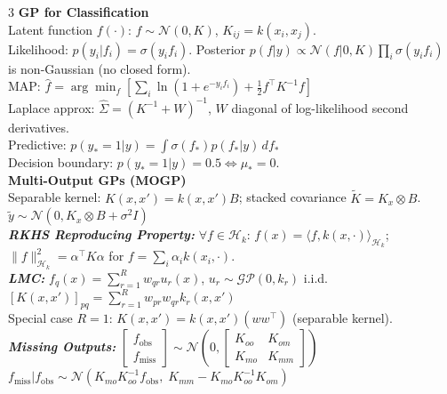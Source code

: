 \documentclass[a4paper,7pt]{article}
\begin{document}
\begin{multicols*}{3}
\textbf{GP for Classification}\\
Latent function $f(\cdot)$: $f\sim\mathcal{N}(0,K)$, $K_{ij}=k(x_i,x_j)$.\\
Likelihood: $p(y_i|f_i)=\sigma(y_i f_i)$. Posterior $p(f|y)\propto\mathcal{N}(f|0,K)\prod_i\sigma(y_if_i)$ is non-Gaussian (no closed form).\\
MAP: $\hat f=\arg\min_f[\sum_i\ln(1+e^{-y_if_i})+\frac{1}{2}f^\top K^{-1}f]$\\
Laplace approx: $\hat\Sigma=(K^{-1}+W)^{-1}$, $W$ diagonal of log-likelihood second derivatives.\\
Predictive: $p(y_*=1|y)=\int\sigma(f_*)p(f_*|y)\,df_*$\\
Decision boundary: $p(y_*=1|y)=0.5\Leftrightarrow\mu_*=0$.\\

\textbf{Multi-Output GPs (MOGP)}\\
Separable kernel: $K(x,x')=k(x,x')B$; stacked covariance $\tilde K=K_x\otimes B$.\\
$\tilde y\sim\mathcal{N}(0,K_x\otimes B+\sigma^2 I)$\\

\textit{\textbf{RKHS Reproducing Property:}} $\forall f\in\mathcal{H}_k$: $f(x)=\langle f,k(x,\cdot)\rangle_{\mathcal{H}_k}$; $\|f\|_{\mathcal{H}_k}^2=\alpha^\top K\alpha$ for $f=\sum_i\alpha_i k(x_i,\cdot)$.\\

\textit{\textbf{LMC:}} $f_q(x)=\sum_{r=1}^R w_{qr}u_r(x)$, $u_r\sim\mathcal{GP}(0,k_r)$ i.i.d.\\
$[K(x,x')]_{pq}=\sum_{r=1}^R w_{pr}w_{qr}k_r(x,x')$\\
Special case $R=1$: $K(x,x')=k(x,x')(ww^\top)$ (separable kernel).\\

\textit{\textbf{Missing Outputs:}} $\begin{bmatrix}f_\mathrm{obs}\\f_\mathrm{miss}\end{bmatrix}\sim\mathcal{N}\!\left(0,\begin{bmatrix}K_{oo}&K_{om}\\K_{mo}&K_{mm}\end{bmatrix}\right)$\\
$f_\mathrm{miss}|f_\mathrm{obs}\sim\mathcal{N}(K_{mo}K_{oo}^{-1}f_\mathrm{obs},\;K_{mm}-K_{mo}K_{oo}^{-1}K_{om})$\\


\end{multicols*}
\end{document}
